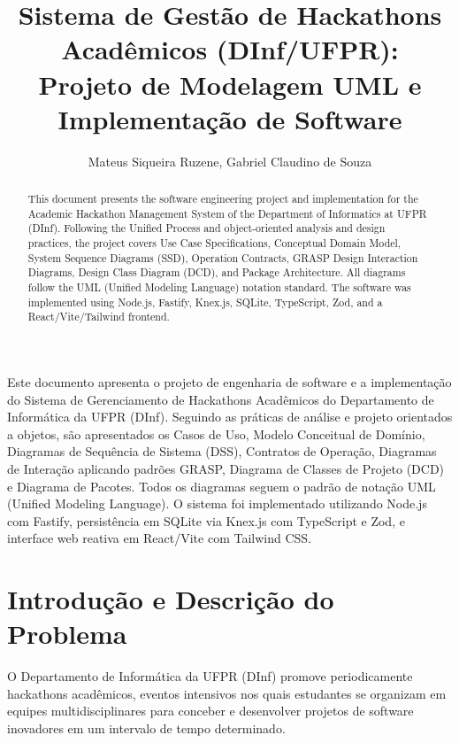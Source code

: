 \documentclass[12pt]{article}
\title{Sistema de Gestão de Hackathons Acadêmicos (DInf/UFPR):\\ Projeto de Modelagem UML e Implementação de Software}
\author{Mateus Siqueira Ruzene\inst{1}, Gabriel Claudino de Souza\inst{1}}
\begin{document}
 

\maketitle

\begin{abstract}
  This document presents the software engineering project and implementation for the Academic Hackathon Management System of the Department of Informatics at UFPR (DInf). Following the Unified Process and object-oriented analysis and design practices, the project covers Use Case Specifications, Conceptual Domain Model, System Sequence Diagrams (SSD), Operation Contracts, GRASP Design Interaction Diagrams, Design Class Diagram (DCD), and Package Architecture. All diagrams follow the UML (Unified Modeling Language) notation standard. The software was implemented using Node.js, Fastify, Knex.js, SQLite, TypeScript, Zod, and a React/Vite/Tailwind frontend.
\end{abstract}
     
\begin{resumo} 
  Este documento apresenta o projeto de engenharia de software e a implementação do Sistema de Gerenciamento de Hackathons Acadêmicos do Departamento de Informática da UFPR (DInf). Seguindo as práticas de análise e projeto orientados a objetos, são apresentados os Casos de Uso, Modelo Conceitual de Domínio, Diagramas de Sequência de Sistema (DSS), Contratos de Operação, Diagramas de Interação aplicando padrões GRASP, Diagrama de Classes de Projeto (DCD) e Diagrama de Pacotes. Todos os diagramas seguem o padrão de notação UML (Unified Modeling Language). O sistema foi implementado utilizando Node.js com Fastify, persistência em SQLite via Knex.js com TypeScript e Zod, e interface web reativa em React/Vite com Tailwind CSS.
\end{resumo}

\section{Introdução e Descrição do Problema}

O Departamento de Informática da UFPR (DInf) promove periodicamente hackathons acadêmicos, eventos intensivos nos quais estudantes se organizam em equipes multidisciplinares para conceber e desenvolver projetos de software inovadores em um intervalo de tempo determinado.
\end{document}
